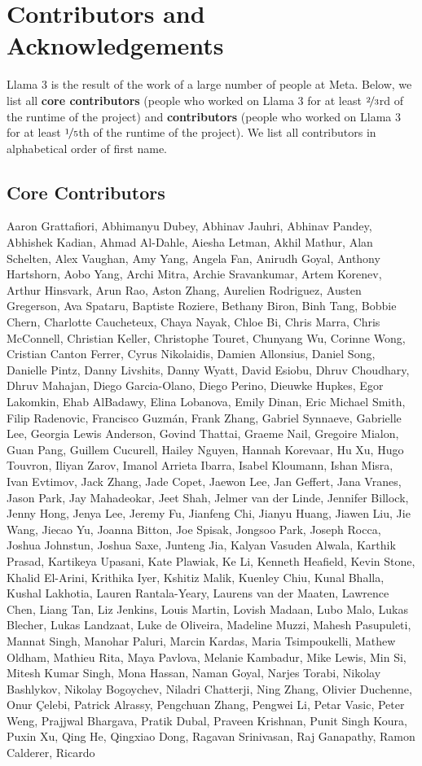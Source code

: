 \documentclass[dvipsnames]{fairmeta}
\begin{document}
\clearpage
\section*{Contributors and Acknowledgements}
Llama 3 is the result of the work of a large number of people at Meta.
Below, we list all \textbf{core contributors} (people who worked on Llama 3 for at least $\nicefrac{2}{3}$rd of the runtime of the project) and \textbf{contributors} (people who worked on Llama 3 for at least $\nicefrac{1}{5}$th of the runtime of the project).
We list all contributors in alphabetical order of first name.

\subsection*{Core Contributors}
Aaron Grattafiori, Abhimanyu Dubey, Abhinav Jauhri, Abhinav Pandey, Abhishek Kadian, Ahmad Al-Dahle, Aiesha Letman, Akhil Mathur, Alan Schelten, Alex Vaughan, Amy Yang, Angela Fan, Anirudh Goyal, Anthony Hartshorn, Aobo Yang, Archi Mitra, Archie Sravankumar, Artem Korenev, Arthur Hinsvark, Arun Rao, Aston Zhang, Aurelien Rodriguez, Austen Gregerson, Ava Spataru, Baptiste Roziere, Bethany Biron, Binh Tang, Bobbie Chern, Charlotte Caucheteux, Chaya Nayak, Chloe Bi, Chris Marra, Chris McConnell, Christian Keller, Christophe Touret, Chunyang Wu, Corinne Wong, Cristian Canton Ferrer, Cyrus Nikolaidis, Damien Allonsius, Daniel Song, Danielle Pintz, Danny Livshits, Danny Wyatt, David Esiobu, Dhruv Choudhary, Dhruv Mahajan, Diego Garcia-Olano, Diego Perino, Dieuwke Hupkes, Egor Lakomkin, Ehab AlBadawy, Elina Lobanova, Emily Dinan, Eric Michael Smith, Filip Radenovic, Francisco Guzmán, Frank Zhang, Gabriel Synnaeve, Gabrielle Lee, Georgia Lewis Anderson, Govind Thattai, Graeme Nail, Gregoire Mialon, Guan Pang, Guillem Cucurell, Hailey Nguyen, Hannah Korevaar, Hu Xu, Hugo Touvron, Iliyan Zarov, Imanol Arrieta Ibarra, Isabel Kloumann, Ishan Misra, Ivan Evtimov, Jack Zhang, Jade Copet, Jaewon Lee, Jan Geffert, Jana Vranes, Jason Park, Jay Mahadeokar, Jeet Shah, Jelmer van der Linde, Jennifer Billock, Jenny Hong, Jenya Lee, Jeremy Fu, Jianfeng Chi, Jianyu Huang, Jiawen Liu, Jie Wang, Jiecao Yu, Joanna Bitton, Joe Spisak, Jongsoo Park, Joseph Rocca, Joshua Johnstun, Joshua Saxe, Junteng Jia, Kalyan Vasuden Alwala, Karthik Prasad, Kartikeya Upasani, Kate Plawiak, Ke Li, Kenneth Heafield, Kevin Stone, Khalid El-Arini, Krithika Iyer, Kshitiz Malik, Kuenley Chiu, Kunal Bhalla, Kushal Lakhotia, Lauren Rantala-Yeary, Laurens van der Maaten, Lawrence Chen, Liang Tan, Liz Jenkins, Louis Martin, Lovish Madaan, Lubo Malo, Lukas Blecher, Lukas Landzaat, Luke de Oliveira, Madeline Muzzi, Mahesh Pasupuleti, Mannat Singh, Manohar Paluri, Marcin Kardas, Maria Tsimpoukelli, Mathew Oldham, Mathieu Rita, Maya Pavlova, Melanie Kambadur, Mike Lewis, Min Si, Mitesh Kumar Singh, Mona Hassan, Naman Goyal, Narjes Torabi, Nikolay Bashlykov, Nikolay Bogoychev, Niladri Chatterji, Ning Zhang, Olivier Duchenne, Onur Çelebi, Patrick Alrassy, Pengchuan Zhang, Pengwei Li, Petar Vasic, Peter Weng, Prajjwal Bhargava, Pratik Dubal, Praveen Krishnan, Punit Singh Koura, Puxin Xu, Qing He, Qingxiao Dong, Ragavan Srinivasan, Raj Ganapathy, Ramon Calderer, Ricardo 
\end{document}
